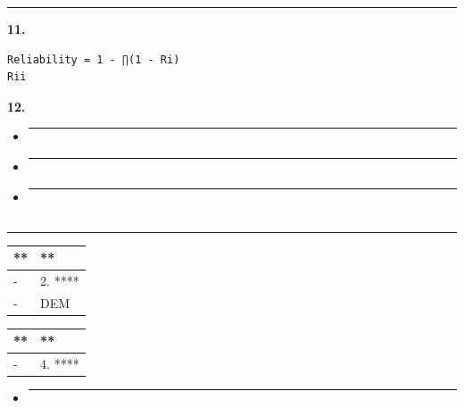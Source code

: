 \begin{center}\rule{0.5\linewidth}{0.5pt}\end{center}

\textbf{11. }

\begin{verbatim}
Reliability = 1 - ∏(1 - Ri)
Rii
\end{verbatim}

\textbf{12. }

\begin{itemize}
\item
  \begin{center}\rule{0.5\linewidth}{0.5pt}\end{center}
\item
  \begin{center}\rule{0.5\linewidth}{0.5pt}\end{center}
\item
  \begin{center}\rule{0.5\linewidth}{0.5pt}\end{center}
\end{itemize}

\subsection{}\label{section-29}

\begin{center}\rule{0.5\linewidth}{0.5pt}\end{center}

\begin{longtable}[]{@{}ll@{}}
\toprule\noalign{}
** & ** \\
\midrule\noalign{}
\endhead
\bottomrule\noalign{}
\endlastfoot
- & 2. **** \\
- & DEM \\
\end{longtable}

\begin{longtable}[]{@{}ll@{}}
\toprule\noalign{}
** & ** \\
\midrule\noalign{}
\endhead
\bottomrule\noalign{}
\endlastfoot
- & 4. **** \\
\end{longtable}

\begin{itemize}
\item
  \begin{center}\rule{0.5\linewidth}{0.5pt}\end{center}
\end{itemize}

